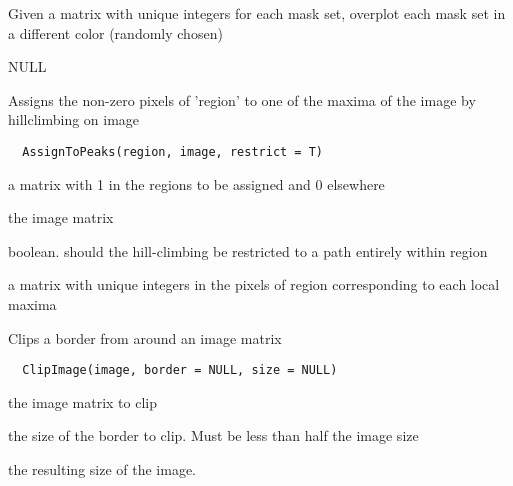 \documentclass[a4paper]{book}
\begin{document}
%
\begin{Details}\relax
Given a matrix with unique integers for each mask set,
overplot each mask set in a different color (randomly
chosen)
\end{Details}
%
\begin{Value}
NULL
\end{Value}
%
\begin{Description}\relax
Assigns the non-zero pixels of 'region' to one of the
maxima of the image by hillclimbing on image
\end{Description}
%
\begin{Usage}
\begin{verbatim}
  AssignToPeaks(region, image, restrict = T)
\end{verbatim}
\end{Usage}
%
\begin{Arguments}
\begin{ldescription}
\item[\code{region}] a matrix with 1 in the regions to be
assigned and 0 elsewhere

\item[\code{image}] the image matrix

\item[\code{restrict}] boolean.  should the hill-climbing be
restricted to a path entirely within region
\end{ldescription}
\end{Arguments}
%
\begin{Value}
a matrix with unique integers in the pixels of region
corresponding to each local maxima
\end{Value}
%
\begin{Description}\relax
Clips a border from around an image matrix
\end{Description}
%
\begin{Usage}
\begin{verbatim}
  ClipImage(image, border = NULL, size = NULL)
\end{verbatim}
\end{Usage}
%
\begin{Arguments}
\begin{ldescription}
\item[\code{image}] the image matrix to clip

\item[\code{border}] the size of the border to clip.  Must be
less than half the image size

\item[\code{size}] the resulting size of the image.
\end{ldescription}
\end{Arguments}
\end{document}

